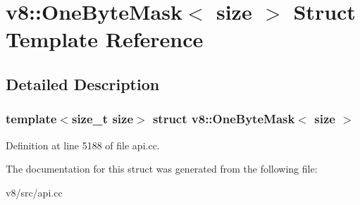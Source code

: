 \hypertarget{structv8_1_1OneByteMask}{}\section{v8\+:\+:One\+Byte\+Mask$<$ size $>$ Struct Template Reference}
\label{structv8_1_1OneByteMask}


\subsection{Detailed Description}
\subsubsection*{template$<$size\+\_\+t size$>$\newline
struct v8\+::\+One\+Byte\+Mask$<$ size $>$}



Definition at line 5188 of file api.\+cc.



The documentation for this struct was generated from the following file\+:\begin{DoxyCompactItemize}
\item 
v8/src/api.\+cc\end{DoxyCompactItemize}
